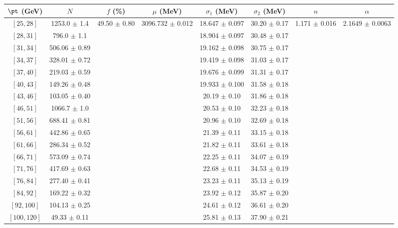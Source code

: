 \begin{tabular}{c||c|c|c|c|c|c|c}
$\pt$ (GeV) & $N$ & $f$ (\%) & $\mu$ (MeV) & $\sigma_1$ (MeV) & $\sigma_2$ (MeV) & $n$ & $\alpha$ \\
\hline
$[25, 28]$ & 1253.0 $\pm$ 1.4 & \multirow{17}{*}{49.50 $\pm$ 0.80} & \multirow{17}{*}{3096.732 $\pm$ 0.012} & 18.647 $\pm$ 0.097 & 30.20 $\pm$ 0.17 & \multirow{17}{*}{1.171 $\pm$ 0.016} & \multirow{17}{*}{2.1649 $\pm$ 0.0063}\\
$[28, 31]$ & 796.0 $\pm$ 1.1 &  &  & 18.904 $\pm$ 0.097 & 30.48 $\pm$ 0.17 &  & \\
$[31, 34]$ & 506.06 $\pm$ 0.89 &  &  & 19.162 $\pm$ 0.098 & 30.75 $\pm$ 0.17 &  & \\
$[34, 37]$ & 328.01 $\pm$ 0.72 &  &  & 19.419 $\pm$ 0.098 & 31.03 $\pm$ 0.17 &  & \\
$[37, 40]$ & 219.03 $\pm$ 0.59 &  &  & 19.676 $\pm$ 0.099 & 31.31 $\pm$ 0.17 &  & \\
$[40, 43]$ & 149.26 $\pm$ 0.48 &  &  & 19.933 $\pm$ 0.100 & 31.58 $\pm$ 0.18 &  & \\
$[43, 46]$ & 103.05 $\pm$ 0.40 &  &  & 20.19 $\pm$ 0.10 & 31.86 $\pm$ 0.18 &  & \\
$[46, 51]$ & 1066.7 $\pm$ 1.0 &  &  & 20.53 $\pm$ 0.10 & 32.23 $\pm$ 0.18 &  & \\
$[51, 56]$ & 688.41 $\pm$ 0.81 &  &  & 20.96 $\pm$ 0.10 & 32.69 $\pm$ 0.18 &  & \\
$[56, 61]$ & 442.86 $\pm$ 0.65 &  &  & 21.39 $\pm$ 0.11 & 33.15 $\pm$ 0.18 &  & \\
$[61, 66]$ & 286.34 $\pm$ 0.52 &  &  & 21.82 $\pm$ 0.11 & 33.61 $\pm$ 0.18 &  & \\
$[66, 71]$ & 573.09 $\pm$ 0.74 &  &  & 22.25 $\pm$ 0.11 & 34.07 $\pm$ 0.19 &  & \\
$[71, 76]$ & 417.69 $\pm$ 0.63 &  &  & 22.68 $\pm$ 0.11 & 34.53 $\pm$ 0.19 &  & \\
$[76, 84]$ & 277.40 $\pm$ 0.41 &  &  & 23.23 $\pm$ 0.11 & 35.13 $\pm$ 0.19 &  & \\
$[84, 92]$ & 169.22 $\pm$ 0.32 &  &  & 23.92 $\pm$ 0.12 & 35.87 $\pm$ 0.20 &  & \\
$[92, 100]$ & 104.13 $\pm$ 0.25 &  &  & 24.61 $\pm$ 0.12 & 36.61 $\pm$ 0.20 &  & \\
$[100, 120]$ & 49.33 $\pm$ 0.11 &  &  & 25.81 $\pm$ 0.13 & 37.90 $\pm$ 0.21 &  & \\
\end{tabular}
